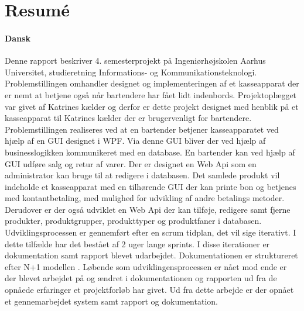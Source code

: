 \chapter{Resumé}
\subsubsection*{Dansk}

Denne rapport beskriver 4. semesterprojekt på Ingeniørhøjskolen Aarhus Universitet, studieretning Informations- og Kommunikationsteknologi. Problemstillingen omhandler designet og implementeringen af et kasseapparat der er nemt at betjene også når bartendere har fået lidt indenbords. Projektoplægget var givet af Katrines kælder og derfor er dette projekt designet med henblik på et kasseapparat til 
Katrines kælder der er brugervenligt for bartendere. 
\newline
\newline
Problemstillingen realiseres ved at en bartender betjener kasseapparatet ved hjælp af en \gls{GUI} designet i \gls{WPF}. Via denne \gls{GUI} bliver der ved hjælp af businesslogikken kommunikeret med en database. En bartender kan ved hjælp af \gls{GUI} udføre salg og retur af varer. Der er designet en  Web Api som en administrator kan bruge til at redigere i databasen. 
\newline
\newline
Det samlede produkt vil indeholde et kasseapparat med en tilhørende \gls{GUI}  der kan printe bon og betjenes med kontantbetaling, med mulighed for udvikling af andre betalings metoder. Derudover er der også udviklet en Web Api  der kan tilføje, redigere samt fjerne produkter, produktgrupper, produkttyper og produktfaner i databasen.
\newline
\newline
Udviklingsprocessen er gennemført efter en scrum tidplan, det vil sige iterativt. I dette tilfælde har det bestået af 2 uger lange sprints. I disse iterationer er dokumentation samt rapport blevet udarbejdet. Dokumentationen er struktureret efter N+1 modellen . Løbende som udviklingensprocessen er nået mod ende er der blevet arbejdet på og ændret i dokumentationen og rapporten ud fra de opnåede erfaringer et projektforløb har givet. Ud fra dette arbejde er der opnået et gennemarbejdet system samt rapport og dokumentation. 
\newline
\newline
\newline
\newline
















